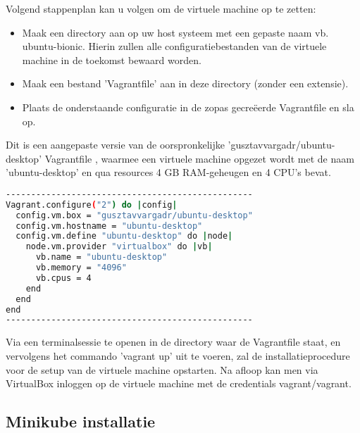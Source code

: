 Volgend stappenplan kan u volgen om de virtuele machine op te zetten:
\begin{itemize}
    \item Maak een directory aan op uw host systeem met een gepaste naam vb. ubuntu-bionic. Hierin zullen alle configuratiebestanden van de virtuele machine in de toekomst bewaard worden.
    \item Maak een bestand 'Vagrantfile' aan in deze directory (zonder een extensie).
    \item Plaats de onderstaande configuratie in de zopas gecreëerde Vagrantfile en sla op.
\end{itemize}
 
Dit is een aangepaste versie van de oorspronkelijke 'gusztavvargadr/ubuntu-desktop' Vagrantfile \autocite{Varga2022}, waarmee een virtuele machine opgezet wordt met de naam 'ubuntu-desktop' en qua resources 4 GB RAM-geheugen en 4 CPU's bevat. 

\begin{lstlisting}[language=bash]
-------------------------------------------------
Vagrant.configure("2") do |config|
  config.vm.box = "gusztavvargadr/ubuntu-desktop"
  config.vm.hostname = "ubuntu-desktop"
  config.vm.define "ubuntu-desktop" do |node|
    node.vm.provider "virtualbox" do |vb|
      vb.name = "ubuntu-desktop"
      vb.memory = "4096"
      vb.cpus = 4
    end
  end
end
-------------------------------------------------
\end{lstlisting}

Via een terminalsessie te openen in de directory waar de Vagrantfile staat, en vervolgens het commando 'vagrant up' uit te voeren, zal de installatieprocedure voor de setup van de virtuele machine opstarten. Na afloop kan men via VirtualBox inloggen op de virtuele machine met de credentials vagrant/vagrant. 


\subsection{Minikube installatie}


